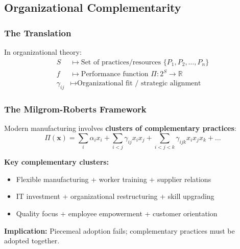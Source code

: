 \subsection{Organizational Complementarity}

\subsubsection{The Translation}

\begin{axiom}
In organizational theory:
\begin{align}
S &\mapsto \text{Set of practices/resources } \{P_1, P_2, \ldots, P_n\} \\
f &\mapsto \text{Performance function } \Pi: 2^S \to \mathbb{R} \\
\gamma_{ij} &\mapsto \text{Organizational fit / strategic alignment}
\end{align}
\end{axiom}

\subsubsection{The Milgrom-Roberts Framework}

\begin{tcolorbox}[colback=blue!5!white,colframe=blue!75!black,title=\textbf{Milgrom \& Roberts (1990, 1995): Organizational Complementarities}]
Modern manufacturing involves \textbf{clusters of complementary practices}:
\begin{equation}
\Pi(\mathbf{x}) = \sum_i \alpha_i x_i + \sum_{i < j} \gamma_{ij} x_i x_j + \sum_{i < j < k} \gamma_{ijk} x_i x_j x_k + \ldots
\end{equation}

\textbf{Key complementary clusters:}
\begin{itemize}[noitemsep]
    \item Flexible manufacturing + worker training + supplier relations
    \item IT investment + organizational restructuring + skill upgrading
    \item Quality focus + employee empowerment + customer orientation
\end{itemize}

\textbf{Implication:} Piecemeal adoption fails; complementary practices must be adopted together.
\end{tcolorbox}


